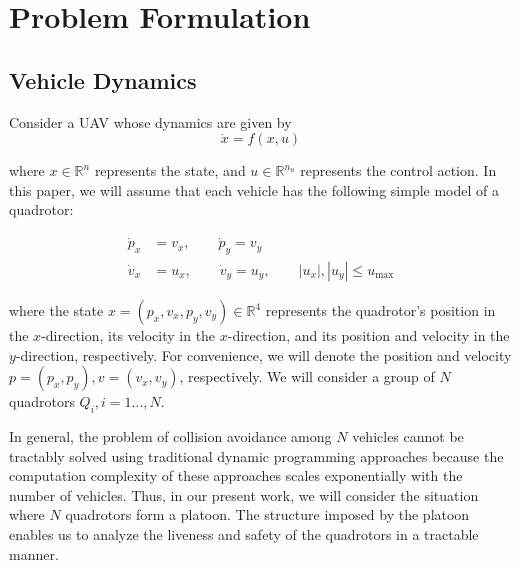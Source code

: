 \section{Problem Formulation \label{sec:formulation}}
\subsection{Vehicle Dynamics}
Consider a UAV whose dynamics are given by
\begin{equation}
\dot{x} = f(x,u)
\end{equation}

\noindent where $x\in\mathbb{R}^n$ represents the state, and $u\in\mathbb{R}^{n_u}$ represents the control action. In this paper, we will assume that each vehicle has the following simple model of a quadrotor:

\begin{equation} \label{eq:dyn}
\begin{aligned}
\dot{p}_x &= v_x, \qquad \dot{p}_y = v_y  \\
\dot{v}_x &= u_x, \qquad \dot{v}_y = u_y, \qquad |u_x|,|u_y| \le u_\text{max}
\end{aligned}
\end{equation}

\noindent where the state $x=(p_x, v_x, p_y, v_y)\in\mathbb{R}^4$ represents the quadrotor's position in the $x$-direction, its velocity in the $x$-direction, and its position and velocity in the $y$-direction, respectively. For convenience, we will denote the position and velocity $p=(p_x, p_y),v=(v_x,v_y)$, respectively. We will consider a group of $N$ quadrotors $Q_i, i=1\ldots,N$.

In general, the problem of collision avoidance among $N$ vehicles cannot be tractably solved using traditional dynamic programming approaches because the computation complexity of these approaches scales exponentially with the number of vehicles. Thus, in our present work, we will consider the situation where $N$ quadrotors form a platoon. The structure imposed by the platoon enables us to analyze the liveness and safety of the quadrotors in a tractable manner.

